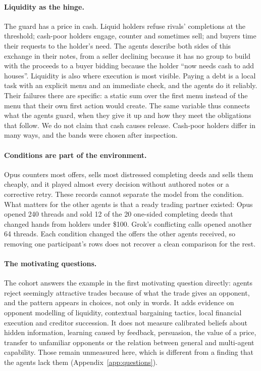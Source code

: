 \documentclass[11pt,letterpaper]{article}
\begin{document}
\paragraph{Liquidity as the hinge.} The guard has a price in cash. Liquid holders refuse rivals' completions at the threshold; cash-poor holders engage, counter and sometimes sell; and buyers time their requests to the holder's need. The agents describe both sides of this exchange in their notes, from a seller declining because it has no group to build with the proceeds to a buyer bidding because the holder ``now needs cash to add houses''. Liquidity is also where execution is most visible. Paying a debt is a local task with an explicit menu and an immediate check, and the agents do it reliably. Their failures there are specific: a static sum over the first menu instead of the menu that their own first action would create. The same variable thus connects what the agents guard, when they give it up and how they meet the obligations that follow. We do not claim that cash causes release. Cash-poor holders differ in many ways, and the bands were chosen after inspection.

\paragraph{Conditions are part of the environment.} Opus counters most offers, sells most distressed completing deeds and sells them cheaply, and it played almost every decision without authored notes or a corrective retry. These records cannot separate the model from the condition. What matters for the other agents is that a ready trading partner existed: Opus opened 240 threads and sold 12 of the 20 one-sided completing deeds that changed hands from holders under \$100. Grok's conflicting calls opened another 64 threads. Each condition changed the offers the other agents received, so removing one participant's rows does not recover a clean comparison for the rest.

\paragraph{The motivating questions.} The cohort answers the example in the first motivating question directly: agents reject seemingly attractive trades because of what the trade gives an opponent, and the pattern appears in choices, not only in words. It adds evidence on opponent modelling of liquidity, contextual bargaining tactics, local financial execution and creditor succession. It does not measure calibrated beliefs about hidden information, learning caused by feedback, persuasion, the value of a price, transfer to unfamiliar opponents or the relation between general and multi-agent capability. Those remain unmeasured here, which is different from a finding that the agents lack them (Appendix~\ref{app:questions}).
\end{document}
